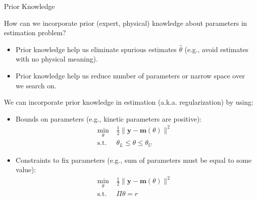 \documentclass[9pt]{beamer}
\begin{document}
%
\begin{frame}{Prior Knowledge}

\begin{block}{}
How can we incorporate prior (expert, physical) knowledge about parameters in  estimation problem? 
\end{block}
\begin{itemize}
\setlength{\itemsep}{5pt}
\item Prior knowledge help us eliminate spurious estimates $\hat{\theta}$ (e.g., avoid estimates with no physical meaning). 
\item Prior knowledge help us reduce number of parameters or narrow space over we search on.
\end{itemize}
We can incorporate prior knowledge in estimation (a.k.a. regularization) by using: 
\begin{itemize}
\item Bounds on parameters (e.g., kinetic parameters are positive):
\begin{align*}
\min_{\theta}& \; \frac{1}{2}\|\mathbf{y}- \mathbf{m}(\theta)\|^2\\ 
\textrm{s.t.}&\; \theta_L\leq \theta\leq\theta_U 
\end{align*}
\item Constraints to fix parameters (e.g., sum of parameters must be equal to some value):
\begin{align*}
\min_{\theta}& \; \frac{1}{2}\|\mathbf{y}- \mathbf{m}(\theta)\|^2\\ 
\textrm{s.t.}&\; \Pi \theta = r
\end{align*}

\end{itemize}
\end{frame}
\end{document}
